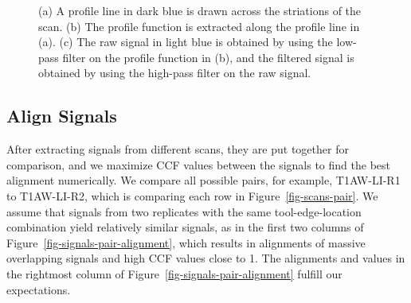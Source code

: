 \documentclass[fleqn,10pt]{wlscirep}
\begin{document}
\begin{figure}
\begin{minipage}{0.50\linewidth}
{}

\subcaption{\label{fig-T1AW-LI-R1-signals-plot}}

\end{minipage}%

\caption{\label{fig-T1AW-LI-R1-profiles-signals}(a) A profile line in
dark blue is drawn across the striations of the scan. (b) The profile
function is extracted along the profile line in (a). (c) The raw signal
in light blue is obtained by using the low-pass filter on the profile
function in (b), and the filtered signal is obtained by using the
high-pass filter on the raw signal.}

\end{figure}%

\subsection*{Align Signals}\label{sec-align-signals}

After extracting signals from different scans, they are put together for
comparison, and we maximize CCF values between the signals to find the
best alignment numerically. We compare all possible pairs, for example,
T1AW-LI-R1 to T1AW-LI-R2, which is comparing each row in
Figure~\ref{fig-scans-pair}. We assume that signals from two replicates
with the same tool-edge-location combination yield relatively similar
signals, as in the first two columns of
Figure~\ref{fig-signals-pair-alignment}, which results in alignments of
massive overlapping signals and high CCF values close to 1. The
alignments and values in the rightmost column of
Figure~\ref{fig-signals-pair-alignment} fulfill our expectations.
\end{document}
